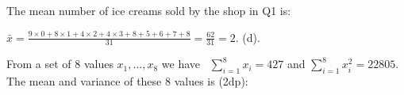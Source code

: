\documentclass[bigtut]{tutorial}
\begin{document}
\begin{tutorial}
\begin{questions}
 \question
The  mean number of ice creams sold by the shop in Q1 is:

\begin{solution}
$\bar{x} = \frac{ 9\times 0 + 8\times 1 +  4 \times 2 + 4 \times 3 + 8 + 5 + 6+7+8}{31}=\frac{62}{31}=2$. (d).
\end{solution}



 \question
 From a set of 8 values $x_1,\ldots,x_8$ we have  \ $\sum_{i=1}^{8} x_i = 427$ and
$\sum_{i=1}^{8} x_i^2 = 22805.$ The mean and variance of these 8 values is (2dp):


\end{questions}
\end{tutorial}
\end{document}

